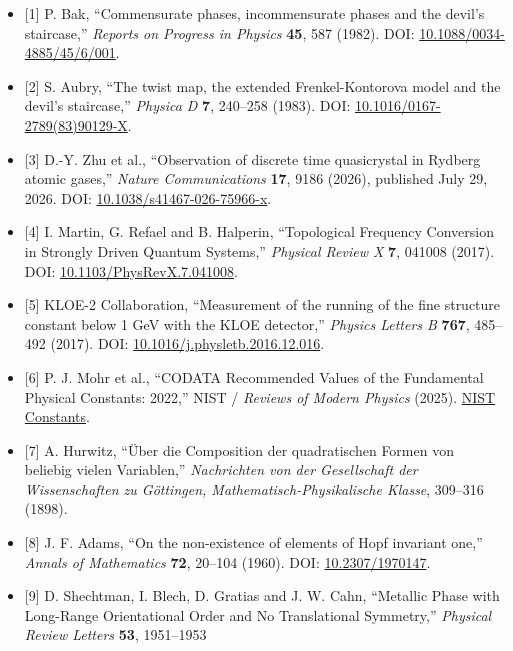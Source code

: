 \documentclass[
  a4paper,
]{article}
\providecommand{\tightlist}{%
  \setlength{\itemsep}{0pt}\setlength{\parskip}{0pt}}
\begin{document}
\begin{itemize}
\tightlist
\item
  {[}1{]} P. Bak, ``Commensurate phases, incommensurate phases and the
  devil's staircase,'' \emph{Reports on Progress in Physics}
  \textbf{45}, 587 (1982). DOI:
  \href{https://doi.org/10.1088/0034-4885/45/6/001}{10.1088/0034-4885/45/6/001}.
\item
  {[}2{]} S. Aubry, ``The twist map, the extended Frenkel-Kontorova
  model and the devil's staircase,'' \emph{Physica D} \textbf{7},
  240--258 (1983). DOI:
  \href{https://doi.org/10.1016/0167-2789(83)90129-X}{10.1016/0167-2789(83)90129-X}.
\item
  {[}3{]} D.-Y. Zhu et al., ``Observation of discrete time quasicrystal
  in Rydberg atomic gases,'' \emph{Nature Communications} \textbf{17},
  9186 (2026), published July 29, 2026. DOI:
  \href{https://doi.org/10.1038/s41467-026-75966-x}{10.1038/s41467-026-75966-x}.
\item
  {[}4{]} I. Martin, G. Refael and B. Halperin, ``Topological Frequency
  Conversion in Strongly Driven Quantum Systems,'' \emph{Physical Review
  X} \textbf{7}, 041008 (2017). DOI:
  \href{https://doi.org/10.1103/PhysRevX.7.041008}{10.1103/PhysRevX.7.041008}.
\item
  {[}5{]} KLOE-2 Collaboration, ``Measurement of the running of the fine
  structure constant below 1 GeV with the KLOE detector,'' \emph{Physics
  Letters B} \textbf{767}, 485--492 (2017). DOI:
  \href{https://doi.org/10.1016/j.physletb.2016.12.016}{10.1016/j.physletb.2016.12.016}.
\item
  {[}6{]} P. J. Mohr et al., ``CODATA Recommended Values of the
  Fundamental Physical Constants: 2022,'' NIST / \emph{Reviews of Modern
  Physics} (2025). \href{https://physics.nist.gov/constants}{NIST
  Constants}.
\item
  {[}7{]} A. Hurwitz, ``Über die Composition der quadratischen Formen
  von beliebig vielen Variablen,'' \emph{Nachrichten von der
  Gesellschaft der Wissenschaften zu Göttingen,
  Mathematisch-Physikalische Klasse}, 309--316 (1898).
\item
  {[}8{]} J. F. Adams, ``On the non-existence of elements of Hopf
  invariant one,'' \emph{Annals of Mathematics} \textbf{72}, 20--104
  (1960). DOI: \href{https://doi.org/10.2307/1970147}{10.2307/1970147}.
\item
  {[}9{]} D. Shechtman, I. Blech, D. Gratias and J. W. Cahn, ``Metallic
  Phase with Long-Range Orientational Order and No Translational
  Symmetry,'' \emph{Physical Review Letters} \textbf{53}, 1951--1953

\end{itemize}
\end{document}
